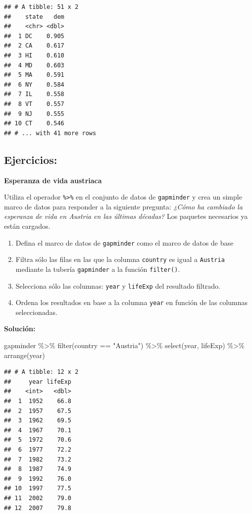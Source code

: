 \documentclass[
]{book}
\newenvironment{Shaded}{\begin{snugshade}}{\end{snugshade}}
\newcommand{\FunctionTok}[1]{\textcolor[rgb]{0.00,0.00,0.00}{#1}}
\newcommand{\NormalTok}[1]{#1}
\newcommand{\SpecialCharTok}[1]{\textcolor[rgb]{0.00,0.00,0.00}{#1}}
\newcommand{\StringTok}[1]{\textcolor[rgb]{0.31,0.60,0.02}{#1}}
\providecommand{\tightlist}{%
  \setlength{\itemsep}{0pt}\setlength{\parskip}{0pt}}
\begin{document}
\begin{verbatim}
## # A tibble: 51 x 2
##    state   dem
##    <chr> <dbl>
##  1 DC    0.905
##  2 CA    0.617
##  3 HI    0.610
##  4 MD    0.603
##  5 MA    0.591
##  6 NY    0.584
##  7 IL    0.558
##  8 VT    0.557
##  9 NJ    0.555
## 10 CT    0.546
## # ... with 41 more rows
\end{verbatim}

\hypertarget{ejercicios}{%
\subsection{Ejercicios:}\label{ejercicios}}

\textbf{Esperanza de vida austriaca}

Utiliza el operador \texttt{\%\textgreater{}\%} en el conjunto de datos de \texttt{gapminder} y crea un simple marco de datos para responder a la siguiente pregunta: \emph{¿Cómo ha cambiado la esperanza de vida en Austria en las últimas décadas?} Los paquetes necesarios ya están cargados.

\begin{enumerate}
\def\labelenumi{\arabic{enumi}.}
\tightlist
\item
  Defina el marco de datos de \texttt{gapminder} como el marco de datos de base
\item
  Filtra sólo las filas en las que la columna \texttt{country} es igual a \texttt{Austria} mediante la tubería \texttt{gapminder} a la función \texttt{filter()}.
\item
  Selecciona sólo las columnas: \texttt{year} y \texttt{lifeExp} del resultado filtrado.
\item
  Ordena los resultados en base a la columna \texttt{year} en función de las columnas seleccionadas.
\end{enumerate}

\textbf{Solución:}

\begin{Shaded}
\begin{Highlighting}[]
\NormalTok{gapminder }\SpecialCharTok{\%\textgreater{}\%}
  \FunctionTok{filter}\NormalTok{(country }\SpecialCharTok{==} \StringTok{"Austria"}\NormalTok{) }\SpecialCharTok{\%\textgreater{}\%}
  \FunctionTok{select}\NormalTok{(year, lifeExp) }\SpecialCharTok{\%\textgreater{}\%}
  \FunctionTok{arrange}\NormalTok{(year)}
\end{Highlighting}
\end{Shaded}

\begin{verbatim}
## # A tibble: 12 x 2
##     year lifeExp
##    <int>   <dbl>
##  1  1952    66.8
##  2  1957    67.5
##  3  1962    69.5
##  4  1967    70.1
##  5  1972    70.6
##  6  1977    72.2
##  7  1982    73.2
##  8  1987    74.9
##  9  1992    76.0
## 10  1997    77.5
## 11  2002    79.0
## 12  2007    79.8
\end{verbatim}
\end{document}
